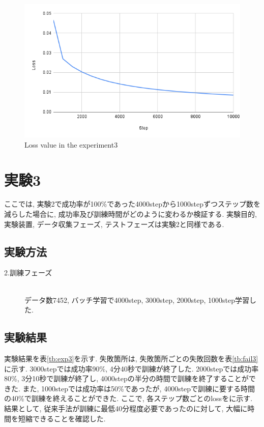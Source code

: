 \begin{figure}[h]
  \centering
  \includegraphics[keepaspectratio, scale=0.31]{images/exp3_10000.png}
  \caption{Loss value in the experiment3}
  \label{Fig:exp2.2-10000}
  \end{figure}

\section{実験3}
ここでは, 実験2で成功率が100\%であった4000stepから1000stepずつステップ数を減らした場合に, 成功率及び訓練時間がどのように変わるか検証する. 実験目的, 実験装置, データ収集フェーズ, テストフェーズは実験2と同様である. 

\subsection{実験方法}
\begin{description}
  \item[2.訓練フェーズ]\mbox{}\\データ数7452, バッチ学習で4000step, 3000step, 2000step, 1000step学習した. 
\end{description}

\subsection{実験結果}
実験結果を表\ref{tb:exp3}を示す. 失敗箇所は, 失敗箇所ごとの失敗回数を表\ref{tb:fail3}に示す. 3000stepでは成功率90\%, 4分40秒で訓練が終了した. 2000stepでは成功率80\%, 3分10秒で訓練が終了し, 4000stepの半分の時間で訓練を終了することができた. また, 1000stepでは成功率は50\%であったが, 4000stepで訓練に要する時間の40\%で訓練を終えることができた. ここで, 各ステップ数ごとのlossをに示す. 結果として, 従来手法が訓練に最低40分程度必要であったのに対して, 大幅に時間を短縮できることを確認した. 

